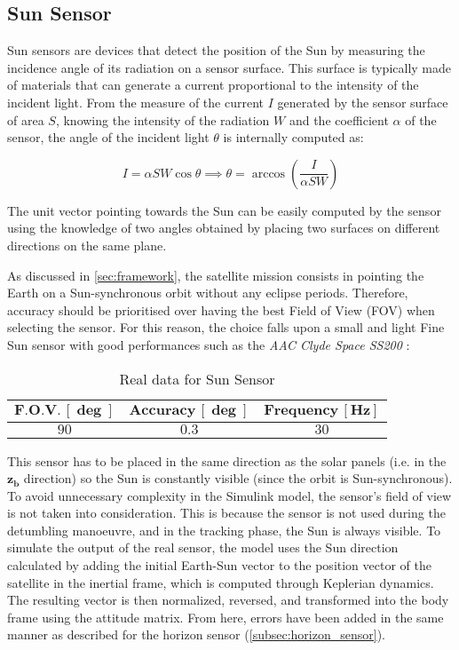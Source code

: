 \subsection{Sun Sensor}
\label{subsec:sun_sensor}

Sun sensors are devices that detect the position of the Sun by measuring the incidence angle of its radiation on a sensor surface. This surface is typically made of materials that can generate a current proportional to the intensity of the incident light. From the measure of the current $I$ generated by the sensor surface of area $S$, knowing the intensity of the radiation $W$ and the coefficient $\alpha$ of the sensor, the angle of the incident light $\theta$ is internally computed as:

\begin{equation}
    I = \alpha S W \cos \theta  \implies  \theta = \arccos \left( \frac{I}{\alpha S W} \right)
\end{equation}

The unit vector pointing towards the Sun can be easily computed by the sensor using the knowledge of two angles obtained by placing two surfaces on different directions on the same plane.

As discussed in \autoref{sec:framework}, the satellite mission consists in pointing the Earth on a Sun-synchronous orbit without any eclipse periods. Therefore, accuracy should be prioritised over having the best Field of View (FOV) when selecting the sensor. For this reason, the choice falls upon a small and light Fine Sun sensor with good performances such as the \textit{AAC Clyde Space SS200} \cite{sun_sensor_site}:

\begin{table}[H]

    \centering
    \begin{tabular}{|c|c|c|}
    \hline
    $\bm{F.O.V. \, [\deg]}$ & $\bm{Accuracy \, [\deg]}$ & $\bm{Frequency \, [Hz]}$ \\
    \hline
    $90$ & $0.3$ & $30$  \\
    \hline
    \end{tabular}
    
    \caption{Real data for Sun Sensor}
    \label{table:Sun_sensor}
    
\end{table}

This sensor has to be placed in the same direction as the solar panels (i.e. in the $\boldsymbol{z_b}$ direction) so the Sun is constantly visible (since the orbit is Sun-synchronous). To avoid unnecessary complexity in the Simulink model, the sensor's field of view is not taken into consideration. This is because the sensor is not used during the detumbling manoeuvre, and in the tracking phase, the Sun is always visible.
To simulate the output of the real sensor, the model uses the Sun direction calculated by adding the initial Earth-Sun vector to the position vector of the satellite in the inertial frame, which is computed through Keplerian dynamics. The resulting vector is then normalized, reversed, and transformed into the body frame using the attitude matrix. From here, errors have been added in the same manner as described for the horizon sensor (\autoref{subsec:horizon_sensor}).